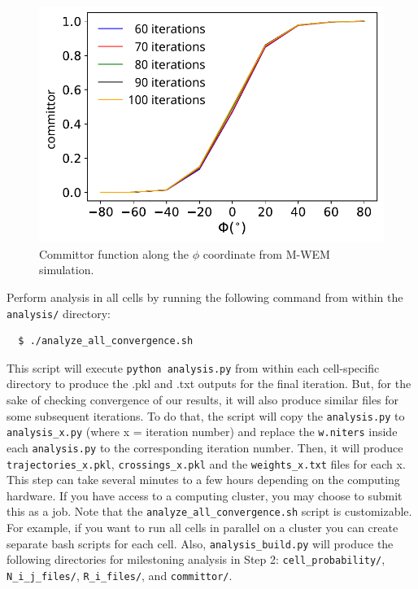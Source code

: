 \begin{figure}[t]
\centering
\includegraphics[width=\columnwidth]{figures/Figure11_Committor.pdf}
\caption{Committor function along the $\phi$ coordinate from M-WEM simulation.}
\end{figure}

Perform analysis in all cells by running the following command from within the \verb|analysis/| directory:

\begin{verbatim}
  $ ./analyze_all_convergence.sh
\end{verbatim}

This script will execute \verb|python analysis.py| from within each cell-specific directory to produce the .pkl and .txt outputs for the final iteration. 
But, for the sake of checking convergence of our results, it will also produce similar files for some subsequent iterations. 
To do that, the script will copy the \verb|analysis.py| to \verb|analysis_x.py| (where x = iteration number) and replace the \verb|w.niters| inside each \verb|analysis.py| to the corresponding iteration number. 
Then, it will produce \verb|trajectories_x.pkl|, \verb|crossings_x.pkl| and the \verb|weights_x.txt| files for each x. 
This step can take several minutes to a few hours depending on the computing hardware. 
If you have access to a computing cluster, you may choose to submit this as a job.
Note that the \verb|analyze_all_convergence.sh| script is customizable. 
For example, if you want to run all cells in parallel on a cluster you can create separate bash scripts for each cell. 
Also, \verb|analysis_build.py| will produce the following directories for milestoning analysis in Step 2: \verb|cell_probability/|, \verb|N_i_j_files/|, \verb|R_i_files/|, and \verb|committor/|.

